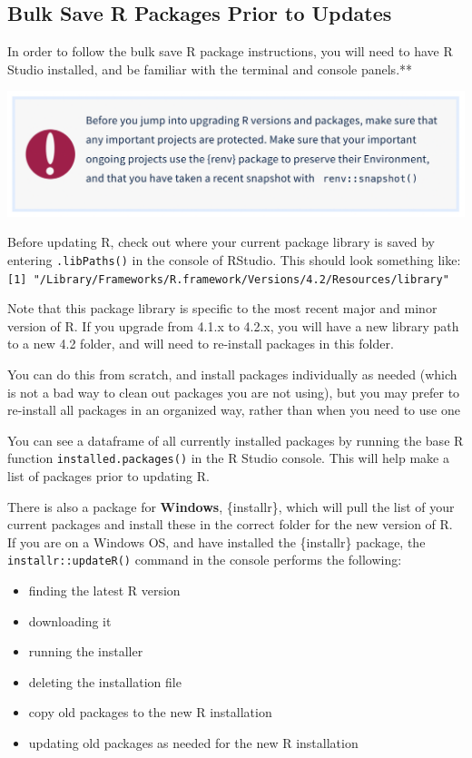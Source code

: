 \documentclass[
]{book}
\providecommand{\tightlist}{%
  \setlength{\itemsep}{0pt}\setlength{\parskip}{0pt}}
\begin{document}
\hypertarget{bulk-save-r-packages-prior-to-updates}{%
\subsection{Bulk Save R Packages Prior to Updates}\label{bulk-save-r-packages-prior-to-updates}}

In order to follow the bulk save R package instructions, you will need to have R Studio installed, and be familiar with the terminal and console panels.**

\begin{flushleft}\includegraphics{images/renv} \end{flushleft}

Before updating R, check out where your current package library is saved by entering \texttt{.libPaths()} in the console of RStudio. This should look something like: \texttt{{[}1{]}\ "/Library/Frameworks/R.framework/Versions/4.2/Resources/library"}

Note that this package library is specific to the most recent major and minor version of R. If you upgrade from 4.1.x to 4.2.x, you will have a new library path to a new 4.2 folder, and will need to re-install packages in this folder.

You can do this from scratch, and install packages individually as needed (which is not a bad way to clean out packages you are not using), but you may prefer to re-install all packages in an organized way, rather than when you need to use one

You can see a dataframe of all currently installed packages by running the base R function \texttt{installed.packages()} in the R Studio console. This will help make a list of packages prior to updating R.

There is also a package for \textbf{Windows}, \{installr\}, which will pull the list of your current packages and install these in the correct folder for the new version of R. If you are on a Windows OS, and have installed the \{installr\} package, the \texttt{installr::updateR()} command in the console performs the following:

\begin{itemize}
\tightlist
\item
  finding the latest R version
\item
  downloading it
\item
  running the installer
\item
  deleting the installation file
\item
  copy old packages to the new R installation
\item
  updating old packages as needed for the new R installation
\end{itemize}
\end{document}

